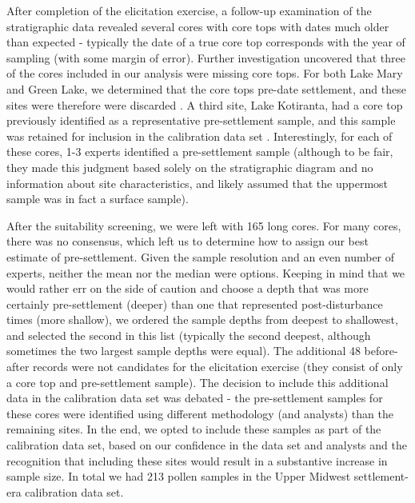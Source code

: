 \documentclass[12pt]{article}
\begin{document}

After completion of the elicitation exercise, a follow-up examination
of the stratigraphic data revealed several cores with core tops with
dates much older than expected - typically the date of a true core top
corresponds with the year of sampling (with some margin of
error). Further investigation uncovered that three of the cores
included in our analysis were missing core tops. For both Lake Mary
and Green Lake, we determined that the core tops pre-date settlement,
and these sites were therefore were discarded \citep{webb1971late,
  lawrenz1975}. A third site, Lake Kotiranta, had a core top
previously identified as a representative pre-settlement sample, and
this sample was retained for inclusion in the calibration data set
\citep{wright1969}. Interestingly, for each of these cores, 1-3
experts identified a pre-settlement sample (although to be fair, they
made this judgment based solely on the stratigraphic diagram and no
information about site characteristics, and likely assumed that the
uppermost sample was in fact a surface sample).

After the suitability screening, we were left with 165 long cores. For
many cores, there was no consensus, which left us to determine how to
assign our best estimate of pre-settlement. Given the sample
resolution and an even number of experts, neither the mean nor the
median were options. Keeping in mind that we would rather err on the
side of caution and choose a depth that was more certainly
pre-settlement (deeper) than one that represented post-disturbance
times (more shallow), we ordered the sample depths from deepest to
shallowest, and selected the second in this list (typically the second
deepest, although sometimes the two largest sample depths were equal).
The additional 48 before-after records were not candidates for the
elicitation exercise (they consist of only a core top and
pre-settlement sample). The decision to include this additional data
in the calibration data set was debated - the pre-settlement samples
for these cores were identified using different methodology (and
analysts) than the remaining sites. In the end, we opted to include
these samples as part of the calibration data set, based on our
confidence in the data set and analysts and the recognition that
including these sites would result in a substantive increase in sample
size. In total we had 213 pollen samples in the Upper Midwest
settlement-era calibration data set.
\end{document}
